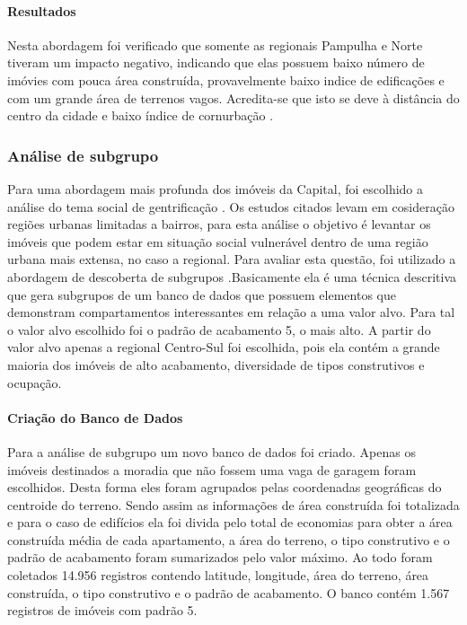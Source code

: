 \documentclass[12pt]{article}
\begin{document}
\paragraph{Resultados}
Nesta abordagem foi verificado que somente as regionais Pampulha e Norte tiveram um impacto negativo, indicando que elas possuem baixo número de imóvies com pouca área construída, provavelmente baixo indice de edificações e com um grande área de terrenos vagos. Acredita-se que isto se deve à distância do centro da cidade e baixo índice de cornurbação \cite{wiki:cornubacao}.

\subsubsection{Análise de subgrupo}
Para uma abordagem mais profunda dos imóveis da Capital, foi escolhido a análise do tema social de gentrificação \cite{dos2019sapucai, solla2019resistencia, andrade2020urban}. Os estudos citados levam em cosideração regiões urbanas limitadas a bairros, para esta análise o objetivo é levantar os imóveis que podem estar em situação social vulnerável dentro de uma região urbana mais extensa, no caso a regional. Para avaliar esta questão, foi utilizado a abordagem de descoberta de subgrupos \cite{atzmueller2015subgroup}.Basicamente ela é uma técnica descritiva que gera subgrupos de um banco de dados que possuem elementos que demonstram compartamentos interessantes em relação a uma valor alvo. Para tal o valor alvo escolhido foi o padrão de acabamento 5, o mais alto. A partir do valor alvo apenas a regional Centro-Sul foi escolhida, pois ela contém a grande maioria dos imóveis de alto acabamento, diversidade de tipos construtivos e ocupação.

\paragraph{Criação do Banco de Dados}
Para a análise de subgrupo um novo banco de dados foi criado. Apenas os imóveis destinados a moradia que não fossem uma vaga de garagem foram escolhidos. Desta forma eles foram agrupados pelas coordenadas geográficas do centroide do terreno. Sendo assim as informações de área construída foi totalizada e para o caso de edifícios ela foi divida pelo total de economias para obter a área construída média de cada apartamento, a área do terreno, o tipo construtivo e o padrão de acabamento foram sumarizados pelo valor máximo. Ao todo foram coletados 14.956 registros contendo latitude, longitude, área do terreno, área construída, o tipo construtivo e o padrão de acabamento. O banco contém 1.567 registros de imóveis com padrão 5.
\end{document}

